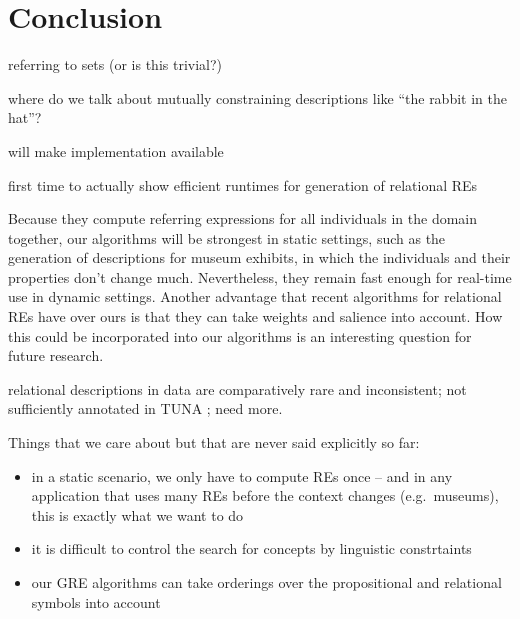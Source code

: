 \section{Conclusion} \label{sec:conclusion}

referring to sets (or is this trivial?)

where do we talk about mutually constraining descriptions like ``the
rabbit in the hat''?

will make implementation available

first time to actually show efficient runtimes for generation of
relational REs


Because they compute referring expressions for all individuals in the
domain together, our algorithms will be strongest in static settings,
such as the generation of descriptions for museum exhibits, in which
the individuals and their properties don't change much.  Nevertheless,
they remain fast enough for real-time use in dynamic settings.
Another advantage that recent algorithms for relational REs
\cite{Krahmer2003,kelleher06:_increm_gener_of_spatial_refer} have over
ours is that they can take weights and salience into account.  How
this could be incorporated into our algorithms is an interesting
question for future research.


relational descriptions in data are comparatively rare and
inconsistent; not sufficiently annotated in TUNA
\cite{deemter06:_build_seman_trans_corpus_for}; need more. 


Things that we care about but that are never said explicitly so far:

\begin{itemize}
\item in a static scenario, we only have to compute REs once -- and in
  any application that uses many REs before the context changes (e.g.\
  museums), this is exactly what we want to do
\item it is difficult to control the search for concepts by linguistic
  constrtaints
\item our GRE algorithms can take orderings over the propositional and
  relational symbols into account
\end{itemize}

